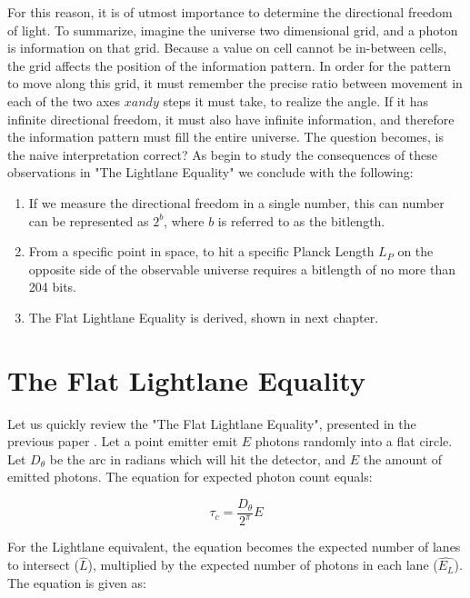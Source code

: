 \documentclass[notitlepage]{article}
\begin{document}
For this reason, it is of utmost importance to determine the directional freedom of light. To summarize, imagine the universe two dimensional grid, and a photon is information on that grid. Because a value on cell cannot be  in-between cells, the grid affects the position of the information pattern. In order for the pattern to move along this grid, it must remember the precise ratio between movement in each of the two axes $x and y$ steps it must take, to realize the angle.  If it has infinite directional freedom, it must also have infinite information, and therefore the information pattern must fill the entire universe. The question becomes, is the naive interpretation correct? As begin to study the consequences of these observations in "The Lightlane Equality" we conclude with the following:


\begin{enumerate}

\item If we measure the directional freedom in a single number, this can number can be represented as $2^b$, where $b$ is referred to as the bitlength.
\item From a specific point in space, to hit a specific Planck Length $L_P$ on the opposite side of the observable universe requires a bitlength of no more than 204 bits.
\item The Flat Lightlane Equality is derived, shown in next chapter.



\end{enumerate}


\section{ The Flat Lightlane Equality}

Let us quickly review the "The Flat Lightlane Equality", presented in the previous paper \citep{RhadamantysA2}. Let a point emitter emit $E$ photons randomly into a flat circle. Let $D_\theta$ be the arc in radians which will hit the detector, and $E$ the amount of emitted photons. The equation for expected photon count  equals:

\begin{equation}
 \hat{\tau_c }= \frac{D_\theta}{2^\pi}E
 \label{eq:taucidentity}
\end{equation}

For the Lightlane equivalent, the equation becomes the expected number of lanes to intersect ($\hat{L}$), multiplied by the expected number of photons in each lane ($\hat{E_L}$). The equation is given as:
\end{document}
